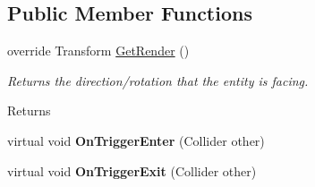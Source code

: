 \subsection*{Public Member Functions}
\begin{DoxyCompactItemize}
\item 
\hypertarget{class_skyrates_1_1_entity_1_1_entity_ship_a4285c0ec1c9f838c1cc5d70355139e9b}{override Transform \hyperlink{class_skyrates_1_1_entity_1_1_entity_ship_a4285c0ec1c9f838c1cc5d70355139e9b}{Get\-Render} ()}\label{class_skyrates_1_1_entity_1_1_entity_ship_a4285c0ec1c9f838c1cc5d70355139e9b}

\begin{DoxyCompactList}\small\item\em Returns the direction/rotation that the entity is facing. 

\begin{DoxyReturn}{Returns}

\end{DoxyReturn}
 \end{DoxyCompactList}\item 
\hypertarget{class_skyrates_1_1_entity_1_1_entity_ship_a780e80e6f56999da91bf2a9fb8999309}{virtual void {\bfseries On\-Trigger\-Enter} (Collider other)}\label{class_skyrates_1_1_entity_1_1_entity_ship_a780e80e6f56999da91bf2a9fb8999309}

\item 
\hypertarget{class_skyrates_1_1_entity_1_1_entity_ship_a82b26c0fd05701ac104bfaf363f061b0}{virtual void {\bfseries On\-Trigger\-Exit} (Collider other)}\label{class_skyrates_1_1_entity_1_1_entity_ship_a82b26c0fd05701ac104bfaf363f061b0}


\end{DoxyCompactItemize}
